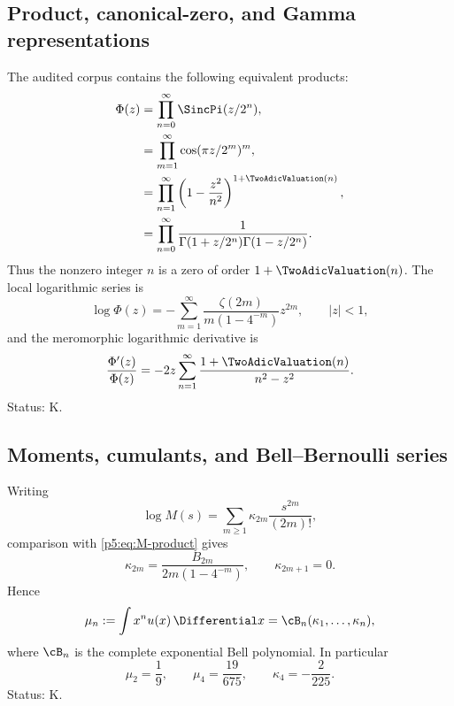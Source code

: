 \documentclass[11pt]{article}
\theoremstyle{definition}
\theoremstyle{remark}
\newcommand{\statusknown}{\textsf{K}}
\begin{document}
\subsection{Product, canonical-zero, and Gamma representations}

The audited corpus contains the following equivalent products:
\begin{align}
 \Phi(z)
 &=\prod_{n=0}^{\infty}\SincPi(z/2^n),                     \label{p5:eq:atlas-sinc}\\
 &=\prod_{m=1}^{\infty}\cos(\pi z/2^m)^m,                  \label{p5:eq:atlas-cos}\\
 &=\prod_{n=1}^{\infty}\left(1-\frac{z^2}{n^2}\right)^{1+\TwoAdicValuation(n)}, \label{p5:eq:atlas-canonical}\\
 &=\prod_{n=0}^{\infty}
   \frac1{\Gamma(1+z/2^n)\Gamma(1-z/2^n)}.                \label{p5:eq:atlas-gamma}
\end{align}
Thus the nonzero integer $n$ is a zero of order $1+\TwoAdicValuation(n)$.  The local
logarithmic series is
\begin{equation}
 \log\Phi(z)=-\sum_{m=1}^{\infty}
 \frac{\zeta(2m)}{m(1-4^{-m})}z^{2m},\qquad |z|<1,          \label{p5:eq:atlas-log-zeta}
\end{equation}
and the meromorphic logarithmic derivative is
\begin{equation}
 \frac{\Phi'(z)}{\Phi(z)}
 =-2z\sum_{n=1}^{\infty}\frac{1+\TwoAdicValuation(n)}{n^2-z^2}.        \label{p5:eq:atlas-log-derivative}
\end{equation}
Status: \statusknown.

\subsection{Moments, cumulants, and Bell--Bernoulli series}

Writing
\begin{equation}
 \log M(s)=\sum_{m\ge1}\kappa_{2m}\frac{s^{2m}}{(2m)!},    \label{p5:eq:cumulant-def}
\end{equation}
comparison with \eqref{p5:eq:M-product} gives
\begin{equation}
 \kappa_{2m}=\frac{B_{2m}}{2m(1-4^{-m})},
 \qquad \kappa_{2m+1}=0.                                  \label{p5:eq:full-cumulants}
\end{equation}
Hence
\begin{equation}
 \mu_n:=\int x^n u(x)\,\Differential x
 =\cB_n(\kappa_1,\ldots,\kappa_n),                         \label{p5:eq:Bell-moments}
\end{equation}
where $\cB_n$ is the complete exponential Bell polynomial.  In particular
\begin{equation}
 \mu_2=\frac19,\qquad \mu_4=\frac{19}{675},\qquad
 \kappa_4=-\frac2{225}.                                   \label{p5:eq:first-moments}
\end{equation}
Status: \statusknown.
\end{document}
